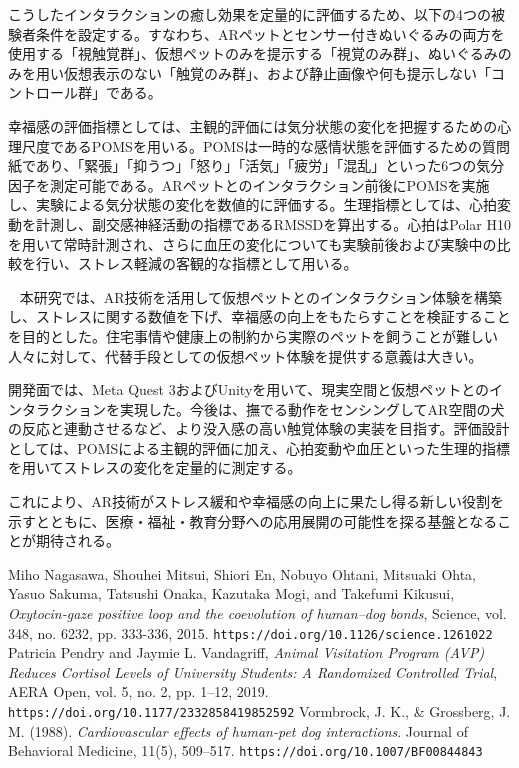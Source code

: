 \documentclass[a4j]{ltjsarticle}
\newcounter{seccnt}
\newcommand{\usection}[1]{\ \newline{\bf\underline{\theseccnt\stepcounter{seccnt}. #1}\hspace{10pt}}}
\begin{document}
こうしたインタラクションの癒し効果を定量的に評価するため、以下の4つの被験者条件を設定する。すなわち、ARペットとセンサー付きぬいぐるみの両方を使用する「視触覚群」、仮想ペットのみを提示する「視覚のみ群」、ぬいぐるみのみを用い仮想表示のない「触覚のみ群」、および静止画像や何も提示しない「コントロール群」である。

幸福感の評価指標としては、主観的評価には気分状態の変化を把握するための心理尺度であるPOMSを用いる。POMSは一時的な感情状態を評価するための質問紙であり、「緊張」「抑うつ」「怒り」「活気」「疲労」「混乱」といった6つの気分因子を測定可能である。ARペットとのインタラクション前後にPOMSを実施し、実験による気分状態の変化を数値的に評価する。生理指標としては、心拍変動を計測し、副交感神経活動の指標であるRMSSDを算出する。心拍はPolar H10を用いて常時計測され、さらに血圧の変化についても実験前後および実験中の比較を行い、ストレス軽減の客観的な指標として用いる。


\usection{まとめ}
本研究では、AR技術を活用して仮想ペットとのインタラクション体験を構築し、ストレスに関する数値を下げ、幸福感の向上をもたらすことを検証することを目的とした。住宅事情や健康上の制約から実際のペットを飼うことが難しい人々に対して、代替手段としての仮想ペット体験を提供する意義は大きい。

開発面では、Meta Quest 3およびUnityを用いて、現実空間と仮想ペットとのインタラクションを実現した。今後は、撫でる動作をセンシングしてAR空間の犬の反応と連動させるなど、より没入感の高い触覚体験の実装を目指す。評価設計としては、POMSによる主観的評価に加え、心拍変動や血圧といった生理的指標を用いてストレスの変化を定量的に測定する。

これにより、AR技術がストレス緩和や幸福感の向上に果たし得る新しい役割を示すとともに、医療・福祉・教育分野への応用展開の可能性を探る基盤となることが期待される。

\small
\begin{thebibliography}{9}
 Miho Nagasawa, Shouhei Mitsui, Shiori En, Nobuyo Ohtani, Mitsuaki Ohta, Yasuo Sakuma, Tatsushi Onaka, Kazutaka Mogi, and Takefumi Kikusui, 
\textit{Oxytocin-gaze positive loop and the coevolution of human–dog bonds}, 
Science, vol. 348, no. 6232, pp. 333-336, 2015.
\texttt{https://doi.org/10.1126/science.1261022}
 Patricia Pendry and Jaymie L. Vandagriff, 
\textit{Animal Visitation Program (AVP) Reduces Cortisol Levels of University Students: A Randomized Controlled Trial}, 
AERA Open, vol. 5, no. 2, pp. 1–12, 2019.
\texttt{https://doi.org/10.1177/2332858419852592}
Vormbrock, J. K., \& Grossberg, J. M. (1988).
\textit{Cardiovascular effects of human-pet dog interactions}.
Journal of Behavioral Medicine, 11(5), 509–517.
\texttt{https://doi.org/10.1007/BF00844843}

\end{thebibliography}
\end{document}
